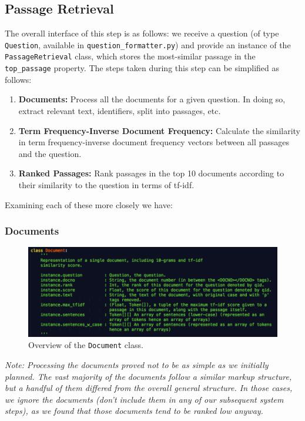 \documentclass{article}
\begin{document}
\subsection{Passage Retrieval}
The overall interface of this step is as follows: we receive a question (of type \texttt{Question}, available in \texttt{question\_formatter.py}) and provide an instance of the \texttt{PassageRetrieval} class, which stores the most-similar passage in the \texttt{top\_passage} property.
The steps taken during this step can be simplified as follows:
\begin{enumerate}
\item \textbf{Documents:} Process all the documents for a given question. In doing so, extract relevant text, identifiers, split into passages, etc.
\item \textbf{Term Frequency-Inverse Document Frequency:} Calculate the similarity in term frequency-inverse document frequency vectors between all passages and the question.
\item \textbf{Ranked Passages: }Rank passages in the top 10 documents according to their similarity to the question in terms of tf-idf.
\end{enumerate}

Examining each of these more closely we have:\\
\subsubsection{Documents}
\begin{figure}[h]
    \centering
    \includegraphics[width=1.0\textwidth]{images/document.png}
    \caption{Overview of the \texttt{Document} class.}
\end{figure}
\textit{Note: Processing the documents proved not to be as simple as we initially planned. The vast majority of the documents follow a similar markup structure, but a handful of them differed from the overall general structure. In those cases, we ignore the documents (don't include them in any of our subsequent system steps), as we found that those documents tend to be ranked low anyway.}
\end{document}
